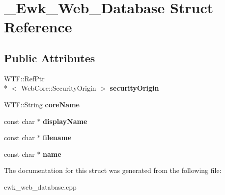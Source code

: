 \hypertarget{struct__Ewk__Web__Database}{\section{\+\_\+\+Ewk\+\_\+\+Web\+\_\+\+Database Struct Reference}
\label{struct__Ewk__Web__Database}
}
\subsection*{Public Attributes}
\begin{DoxyCompactItemize}
\item 
\hypertarget{struct__Ewk__Web__Database_ac36d84ba136d8c9aa5724d6a4d60f8b5}{W\+T\+F\+::\+Ref\+Ptr\\*
$<$ Web\+Core\+::\+Security\+Origin $>$ {\bfseries security\+Origin}}\label{struct__Ewk__Web__Database_ac36d84ba136d8c9aa5724d6a4d60f8b5}

\item 
\hypertarget{struct__Ewk__Web__Database_aa834e44406425bfa6cf4b4e40bcab9ef}{W\+T\+F\+::\+String {\bfseries core\+Name}}\label{struct__Ewk__Web__Database_aa834e44406425bfa6cf4b4e40bcab9ef}

\item 
\hypertarget{struct__Ewk__Web__Database_a44ac3acec41e48ca5d85014fbfd4ee0f}{const char $\ast$ {\bfseries display\+Name}}\label{struct__Ewk__Web__Database_a44ac3acec41e48ca5d85014fbfd4ee0f}

\item 
\hypertarget{struct__Ewk__Web__Database_ae7d4e701fff0a6e2d392f030548af4bf}{const char $\ast$ {\bfseries filename}}\label{struct__Ewk__Web__Database_ae7d4e701fff0a6e2d392f030548af4bf}

\item 
\hypertarget{struct__Ewk__Web__Database_a9ce131b9dd0243a653d3be4f5f98f536}{const char $\ast$ {\bfseries name}}\label{struct__Ewk__Web__Database_a9ce131b9dd0243a653d3be4f5f98f536}

\end{DoxyCompactItemize}


The documentation for this struct was generated from the following file\+:\begin{DoxyCompactItemize}
\item 
ewk\+\_\+web\+\_\+database.\+cpp\end{DoxyCompactItemize}
